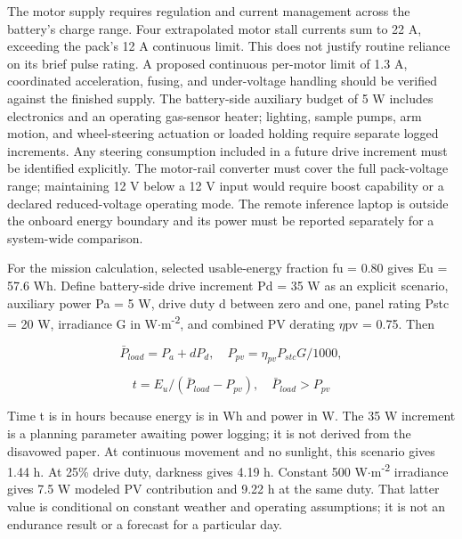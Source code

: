 \documentclass[11pt,letterpaper]{article}
\begin{document}
The motor supply requires regulation and current management across the battery's charge range. Four extrapolated motor stall currents sum to 22 A, exceeding the pack's 12 A continuous limit. This does not justify routine reliance on its brief pulse rating. A proposed continuous per-motor limit of 1.3 A, coordinated acceleration, fusing, and under-voltage handling should be verified against the finished supply. The battery-side auxiliary budget of 5 W includes electronics and an operating gas-sensor heater; lighting, sample pumps, arm motion, and wheel-steering actuation or loaded holding require separate logged increments. Any steering consumption included in a future drive increment must be identified explicitly. The motor-rail converter must cover the full pack-voltage range; maintaining 12 V below a 12 V input would require boost capability or a declared reduced-voltage operating mode. The remote inference laptop is outside the onboard energy boundary and its power must be reported separately for a system-wide comparison.

For the mission calculation, selected usable-energy fraction fu = 0.80 gives Eu = 57.6 Wh. Define battery-side drive increment Pd = 35 W as an explicit scenario, auxiliary power Pa = 5 W, drive duty d between zero and one, panel rating Pstc = 20 W, irradiance G in W\ensuremath{\cdot}m\textsuperscript{-}\textsuperscript{2}, and combined PV derating \ensuremath{\eta}pv = 0.75. Then

\begin{equation}
\bar P_{load}=P_a+dP_d,\quad P_{pv}=\eta_{pv}P_{stc}G/1000,
\label{eq:10}
\end{equation}

\begin{equation}
t=E_u/(\bar P_{load}-P_{pv}),\quad \bar P_{load}>P_{pv}
\label{eq:11}
\end{equation}

Time t is in hours because energy is in Wh and power in W. The 35 W increment is a planning parameter awaiting power logging; it is not derived from the disavowed paper. At continuous movement and no sunlight, this scenario gives 1.44 h. At 25\% drive duty, darkness gives 4.19 h. Constant 500 W\ensuremath{\cdot}m\textsuperscript{-}\textsuperscript{2} irradiance gives 7.5 W modeled PV contribution and 9.22 h at the same duty. That latter value is conditional on constant weather and operating assumptions; it is not an endurance result or a forecast for a particular day.
\end{document}
